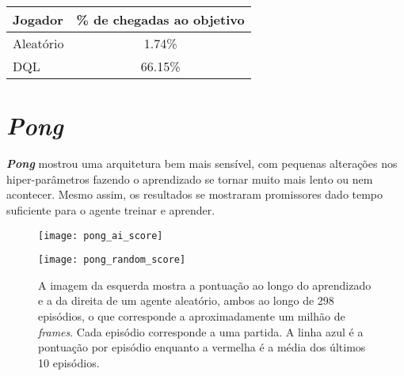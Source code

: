 \begin{table}
\begin{center}
\begin{tabular}{l c}
\hline
Jogador & \% de chegadas ao objetivo \\
\hline
Aleatório & 1.74\% \\
DQL & 66.15\% \\
\hline
\end{tabular}
\label{table:gridworld_score}
\end{center}
\end{table}

\section{\textit{Pong}}
\label{sec:res_pong}

\textbf{\textit{Pong}} mostrou uma arquitetura bem mais sensível, com pequenas alterações nos hiper-parâmetros fazendo o aprendizado se tornar muito mais lento ou nem acontecer.
Mesmo assim, os resultados se mostraram promissores dado tempo suficiente para o agente treinar e aprender.


\begin{figure}[h!]
  \begin{minipage}[b]{.5\textwidth}
  \centering
  \texttt{[image: pong\_ai\_score]}
  \end{minipage}
  \hfill
  \begin{minipage}[b]{.5\textwidth}
  \centering
  \texttt{[image: pong\_random\_score]}
  \end{minipage}
  \caption{A imagem da esquerda mostra a pontuação ao longo do aprendizado e a da direita de um agente aleatório, ambos ao longo de 298 episódios, o que corresponde a aproximadamente um milhão de \textit{frames}. Cada episódio corresponde a uma partida. A linha azul é a pontuação por episódio enquanto a vermelha é a média dos últimos 10 episódios.}
  \label{fig:pong_score}
\end{figure}


